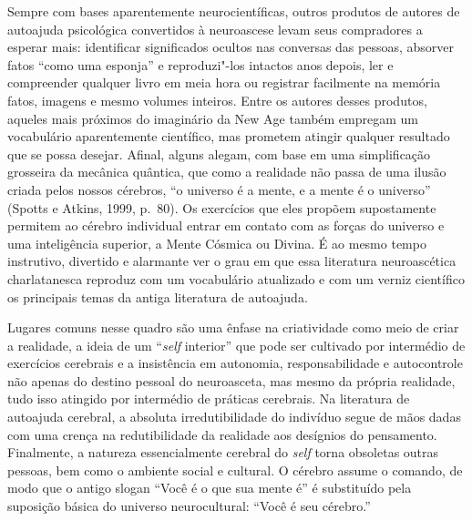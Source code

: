 Sempre com bases aparentemente neurocientíficas, outros produtos de
autores de autoajuda psicológica convertidos à neuroascese levam seus
compradores a esperar mais: identificar significados ocultos nas
conversas das pessoas, absorver fatos ``como uma esponja'' e
reproduzi"-los intactos anos depois, ler e compreender qualquer livro em
meia hora ou registrar facilmente na memória fatos, imagens e mesmo
volumes inteiros. Entre os autores desses produtos, aqueles mais
próximos do imaginário da New Age também empregam um vocabulário
aparentemente científico, mas prometem atingir qualquer resultado que se
possa desejar. Afinal, alguns alegam, com base em uma simplificação
grosseira da mecânica quântica, que como a realidade não passa de uma
ilusão criada pelos nossos cérebros, ``o universo é a mente, e a mente é
o universo'' (Spotts e Atkins, 1999, p.~80). Os exercícios que eles
propõem supostamente permitem ao cérebro individual entrar em contato
com as forças do universo e uma inteligência superior, a Mente Cósmica
ou Divina. É ao mesmo tempo instrutivo, divertido e alarmante ver o grau
em que essa literatura neuroascética charlatanesca reproduz com um
vocabulário atualizado e com um verniz científico os principais temas da
antiga literatura de autoajuda.

Lugares comuns nesse quadro são uma ênfase na criatividade como meio de
criar a realidade, a ideia de um ``\emph{self} interior'' que pode ser
cultivado por intermédio de exercícios cerebrais e a insistência em
autonomia, responsabilidade e autocontrole não apenas do destino pessoal
do neuroasceta, mas mesmo da própria realidade, tudo isso atingido por
intermédio de práticas cerebrais. Na literatura de autoajuda cerebral, a
absoluta irredutibilidade do indivíduo segue de mãos dadas com uma
crença na redutibilidade da realidade aos desígnios do pensamento.
Finalmente, a natureza essencialmente cerebral do \emph{self} torna obsoletas
outras pessoas, bem como o ambiente social e cultural. O cérebro assume o comando,
de modo que o antigo slogan ``Você é o que sua mente é'' é substituído
pela suposição básica do universo neurocultural: ``Você é seu cérebro.''


